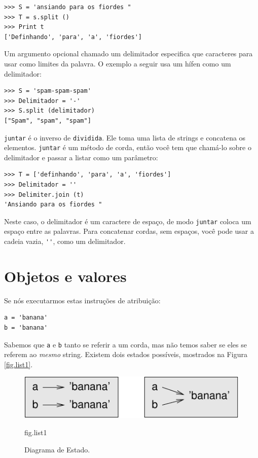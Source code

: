 \documentclass[10pt]{book}
\begin{document}
\begin{verbatim}
>>> S = 'ansiando para os fiordes "
>>> T = s.split ()
>>> Print t
['Definhando', 'para', 'a', 'fiordes']
\end{verbatim}
%
Um argumento opcional chamado um delimitador {\bf} especifica que
caracteres para usar como limites da palavra.
O exemplo a seguir
usa um hífen como um delimitador:

\begin{verbatim}
>>> S = 'spam-spam-spam'
>>> Delimitador = '-'
>>> S.split (delimitador)
["Spam", "spam", "spam"]
\end{verbatim}
%
{\tt juntar} é o inverso de {\tt dividida}. Ele
toma uma lista de strings e
concatena os elementos. {\tt juntar} é um método de corda,
então você tem que chamá-lo sobre o delimitador e passar a
listar como um parâmetro:

\begin{verbatim}
>>> T = ['definhando', 'para', 'a', 'fiordes']
>>> Delimitador = ''
>>> Delimiter.join (t)
'Ansiando para os fiordes "
\end{verbatim}
%
Neste caso, o delimitador é um caractere de espaço, de modo
{\tt juntar} coloca um espaço entre as palavras. Para concatenar
cordas, sem espaços, você pode usar a cadeia vazia,
\Verb "''", como um delimitador. 


\section {Objetos e valores}

Se nós executarmos estas instruções de atribuição:

\begin{verbatim}
a = 'banana'
b = 'banana'
\end{verbatim}
%
Sabemos que {\tt a} e {\tt b} tanto se referir a um
corda, mas não temos
saber se eles se referem ao {\em mesmo} string.
Existem dois estados possíveis, mostrados na Figura ~ \ref {fig.list1}.

\begin{figure}
\centerline
{\includegraphics[scale = 0.8] {figs/list1.pdf}}
\caption{Diagrama de Estado.}
\label{} fig.list1
\end{figure}
\end{document}
